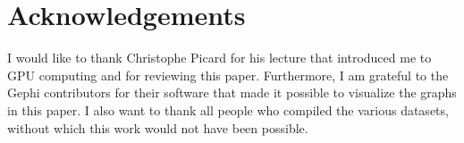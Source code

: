 \section*{Acknowledgements}

I would like to thank Christophe Picard for his lecture that introduced me to GPU computing and for reviewing this paper. Furthermore, I am grateful to the Gephi contributors for their software that made it possible to visualize the graphs in this paper. I also want to thank all people who compiled the various datasets, without which this work would not have been possible.
